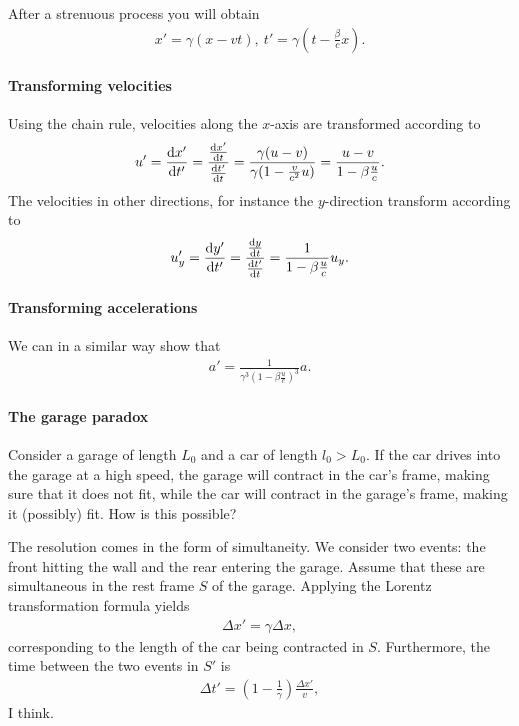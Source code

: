 After a strenuous process you will obtain
\begin{align*}
	x' = \gamma(x - vt),\ t' = \gamma(t - \frac{\beta}{c}x).
\end{align*}

\paragraph{Transforming velocities}
Using the chain rule, velocities along the $x$-axis are transformed according to
\begin{align*}
	u' = \dv{x'}{t'} = \frac{\dv{x'}{t}}{\dv{t'}{t}} = \frac{\gamma(u - v)}{\gamma(1 - \frac{v}{c^{2}}u)} = \frac{u - v}{1 - \beta\frac{u}{c}}.
\end{align*}
The velocities in other directions, for instance the $y$-direction transform according to
\begin{align*}
	u_{y}' = \dv{y'}{t'} = \frac{\dv{y}{t}}{\dv{t'}{t}} = \frac{1}{1 - \beta\frac{u}{c}}u_{y}.
\end{align*}

\paragraph{Transforming accelerations}
We can in a similar way show that
\begin{align*}
	a' = \frac{1}{\gamma^{3}\left(1 - \beta\frac{u}{c}\right)^{3}}a.
\end{align*}

\paragraph{The garage paradox}
Consider a garage of length $L_{0}$ and a car of length $l_{0} > L_{0}$. If the car drives into the garage at a high speed, the garage will contract in the car's frame, making sure that it does not fit, while the car will contract in the garage's frame, making it (possibly) fit. How is this possible?

The resolution comes in the form of simultaneity. We consider two events: the front hitting the wall and the rear entering the garage. Assume that these are simultaneous in the rest frame $S$ of the garage. Applying the Lorentz transformation formula yields
\begin{align*}
	\Delta x' = \gamma\Delta x,
\end{align*}
corresponding to the length of the car being contracted in $S$. Furthermore, the time between the two events in $S'$ is
\begin{align*}
	\Delta t' = (1 - \frac{1}{\gamma})\frac{\Delta x'}{v},
\end{align*}
I think.

